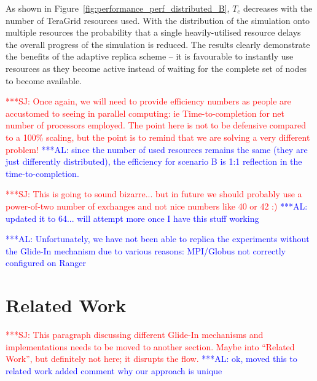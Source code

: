 \documentclass{rspublic}
\newcommand{\alnote}[1]{ {\textcolor{blue} { ***AL: #1 }}}
\newcommand{\jhanote}[1]{ {\textcolor{red} { ***SJ: #1 }}}
\newcommand{\alnote}[1]{}
\newcommand{\jhanote}[1]{}
\begin{document}
As shown in Figure~\ref{fig:performance_perf_distributed_B}, $T_{c}$
decreases with the number of TeraGrid resources used.  With the
distribution of the simulation onto multiple resources the probability
that a single heavily-utilised resource delays the overall progress of
the simulation is reduced.
The results clearly demonstrate the benefits of the adaptive replica
scheme -- it is favourable to instantly use resources as they become
active instead of waiting for the complete set of nodes to become
available.


\jhanote{Once again, we will need to provide efficiency numbers as
  people are accustomed to seeing in parallel computing: ie
  Time-to-completion for net number of processors employed.  The point
  here is not to be defensive compared to a 100\% scaling, but the
  point is to remind that we are solving a very different problem!}
\alnote{since the number of used resources remains the same (they are just differently distributed),
the efficiency for scenario B is 1:1 reflection in the time-to-completion.}  

\jhanote{This is going to sound bizarre... but in future we should
  probably use a power-of-two number of exchanges and not nice numbers
  like 40 or 42 :)}           
\alnote{updated it to 64... will attempt more once I have this stuff working}

                                              
\alnote{Unfortunately, we have not been able to replica the
  experiments without the Glide-In mechanism due to various reasons:
  MPI/Globus not correctly configured on Ranger}


\section{Related Work}

\jhanote{This paragraph discussing different Glide-In mechanisms and
  implementations needs to be moved to another section. Maybe into
  ``Related Work'', but definitely not here; it disrupts the flow.}
\alnote{ok, moved this to related work added comment why our approach is unique}
\end{document}

